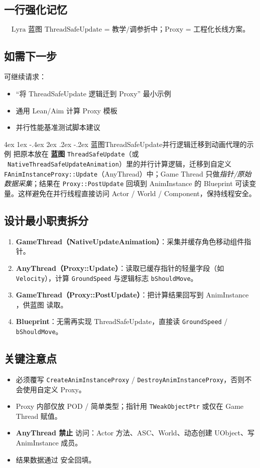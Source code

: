 \documentclass[10pt,openright,oneside,CJKmath]{MyBook}
\makeatletter
\renewcommand{\section}{\@startsection{section}{1}{\z@}%
{4ex \@plus 1ex \@minus -.4ex}%
{2ex \@plus.2ex \@minus -.2ex}%
{\color{black}\rmfamily\large\sffamily\bfseries}}
\makeatother
\begin{document}
\subsection{一行强化记忆}
\[
\boxed{\text{Lyra 蓝图 ThreadSafeUpdate = 教学/调参折中；Proxy = 工程化长线方案。}}
\]

\subsection{如需下一步}
可继续请求：
\begin{itemize}
  \item “将 ThreadSafeUpdate 逻辑迁到 Proxy” 最小示例
  \item 通用 Lean/Aim 计算 Proxy 模板
  \item 并行性能基准测试脚本建议
\end{itemize}

\section{蓝图ThreadSafeUpdate并行逻辑迁移到动画代理的示例}
把原本放在 \textbf{蓝图} \texttt{ThreadSafeUpdate}（或 \cppsign~\texttt{NativeThreadSafeUpdateAnimation}）里的并行计算逻辑，迁移到自定义 \texttt{FAnimInstanceProxy::Update}（AnyThread）中；Game Thread 只做\emph{指针/原始数据采集}；结果在 \texttt{Proxy::PostUpdate} 回填到 AnimInstance 的 Blueprint 可读变量。这样避免在并行线程直接访问 Actor / World / Component，保持线程安全。

\subsection{设计最小职责拆分}
\begin{enumerate}
  \item \textbf{GameThread（NativeUpdateAnimation）}：采集并缓存角色移动组件指针。
  \item \textbf{AnyThread（Proxy::Update）}：读取已缓存指针的轻量字段（如 \texttt{Velocity}），计算 \texttt{GroundSpeed} 与逻辑标志 \texttt{bShouldMove}。
  \item \textbf{GameThread（Proxy::PostUpdate）}：把计算结果回写到 AnimInstance ，供蓝图  读取。
  \item \textbf{Blueprint}：无需再实现 ThreadSafeUpdate，直接读 \texttt{GroundSpeed} / \texttt{bShouldMove}。
\end{enumerate}

\subsection{关键注意点}
\begin{itemize}
  \item 必须覆写 \texttt{CreateAnimInstanceProxy} / \texttt{DestroyAnimInstanceProxy}，否则不会使用自定义 Proxy。
  \item Proxy 内部仅放 POD / 简单类型；指针用 \texttt{TWeakObjectPtr} 或仅在 Game Thread 赋值。
  \item \textbf{AnyThread 禁止} 访问：Actor 方法、ASC、World、动态创建 UObject、写 AnimInstance 成员。
  \item 结果数据通过  安全回填。
\end{itemize}
\end{document}
